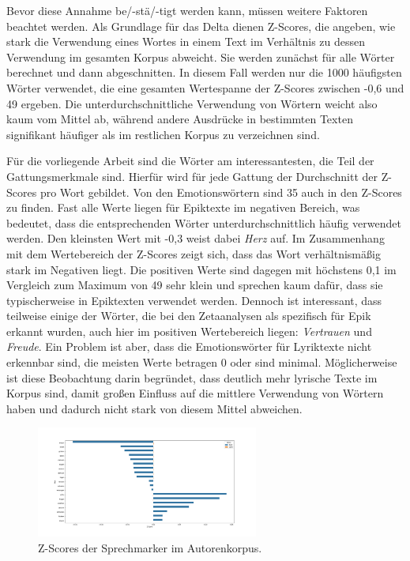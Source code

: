 \documentclass[a4paper,10p]{article}
\begin{document}
Bevor diese Annahme be/-stä/-tigt werden kann, müssen weitere Faktoren beachtet werden. Als Grundlage für das Delta dienen Z-Scores, die angeben, wie stark die Verwendung eines Wortes in einem Text im Verhältnis zu dessen Verwendung im gesamten Korpus abweicht. Sie werden zunächst für alle Wörter berechnet und dann abgeschnitten. In diesem Fall werden nur die 1000 häufigsten Wörter verwendet, die eine gesamten Wertespanne der Z-Scores zwischen -0,6 und 49 ergeben. Die unterdurchschnittliche Verwendung von Wörtern weicht also kaum vom Mittel ab, während andere Ausdrücke in bestimmten Texten signifikant häufiger als im restlichen Korpus zu verzeichnen sind. \par 

Für die vorliegende Arbeit sind die Wörter am interessantesten, die Teil der Gattungsmerkmale sind. Hierfür wird für jede Gattung der Durchschnitt der Z-Scores pro Wort gebildet. Von den Emotionswörtern sind 35 auch in den Z-Scores zu finden. Fast alle Werte liegen für Epiktexte im negativen Bereich, was bedeutet, dass die entsprechenden Wörter unterdurchschnittlich häufig verwendet werden. Den kleinsten Wert mit -0,3 weist dabei \textit{Herz} auf. Im Zusammenhang mit dem Wertebereich der Z-Scores zeigt sich, dass das Wort verhältnismäßig stark im Negativen liegt. Die positiven Werte sind dagegen mit höchstens 0,1 im Vergleich zum Maximum von 49 sehr klein und sprechen kaum dafür, dass sie typischerweise in Epiktexten verwendet werden. Dennoch ist interessant, dass teilweise einige der Wörter, die bei den Zetaanalysen als spezifisch für Epik erkannt wurden, auch hier im positiven Wertebereich liegen: \textit{Vertrauen} und \textit{Freude}. Ein Problem ist aber, dass die Emotionswörter für Lyriktexte nicht erkennbar sind, die meisten Werte betragen 0 oder sind minimal. Möglicherweise ist diese Beobachtung darin begründet, dass deutlich mehr lyrische Texte im Korpus sind, damit großen Einfluss auf die mittlere Verwendung von Wörtern haben und dadurch nicht stark von diesem Mittel abweichen. \par 

\begin{figure}
	\includegraphics[width=0.65\textwidth]{autoren_sprechmarker_zscores.png}
	\caption{Z-Scores der Sprechmarker im Autorenkorpus.}
	\label{fig:zscore_emo}
\end{figure}
\end{document}
